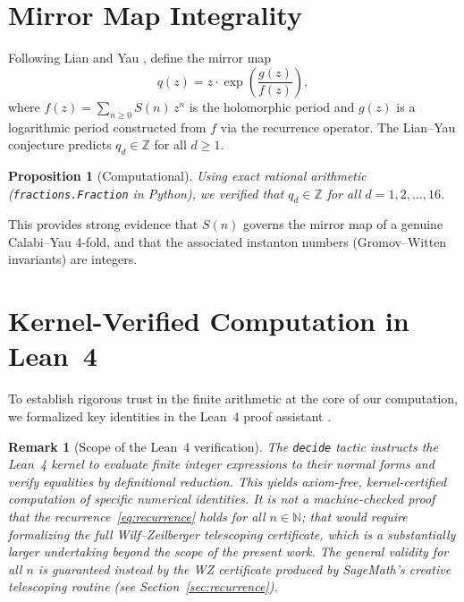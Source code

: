 \documentclass[11pt, a4paper]{article}
\newtheorem{proposition}[theorem]{Proposition}
\newtheorem{remark}[theorem]{Remark}
\begin{document}
\section{Mirror Map Integrality}\label{sec:mirrormap}

Following Lian and Yau \cite{LianYau1996}, define the mirror map
\[
  q(z) = z\cdot\exp\!\left(\frac{g(z)}{f(z)}\right),
\]
where $f(z)=\sum_{n\ge0}S(n)\,z^n$ is the holomorphic period and $g(z)$
is a logarithmic period constructed from $f$ via the recurrence operator.
The Lian--Yau conjecture predicts $q_d\in\mathbb{Z}$ for all $d\ge1$.

\begin{proposition}[Computational]\label{prop:integrality}
Using exact rational arithmetic (\texttt{fractions.Fraction} in Python),
we verified that $q_d\in\mathbb{Z}$ for all $d=1,2,\dots,16$.
\end{proposition}

This provides strong evidence that $S(n)$ governs the mirror map of a
genuine Calabi--Yau 4-fold, and that the associated instanton numbers
(Gromov--Witten invariants) are integers.


\section{Kernel-Verified Computation in Lean~4}\label{sec:lean4}

To establish rigorous trust in the finite arithmetic at the core of our
computation, we formalized key identities in the Lean~4 proof assistant
\cite{deMoura2021}.

\begin{remark}[Scope of the Lean~4 verification]\label{rmk:scope}
The \texttt{decide} tactic instructs the Lean~4 kernel to evaluate finite
integer expressions to their normal forms and verify equalities by
definitional reduction.  This yields \emph{axiom-free, kernel-certified
computation} of specific numerical identities.  It is \emph{not} a
machine-checked proof that the recurrence~\eqref{eq:recurrence} holds
for all $n\in\mathbb{N}$; that would require formalizing the full
Wilf--Zeilberger telescoping certificate, which is a substantially larger
undertaking beyond the scope of the present work.  The general validity for
all $n$ is guaranteed instead by the WZ certificate produced by SageMath's
creative telescoping routine (see Section~\ref{sec:recurrence}).
\end{remark}
\end{document}
